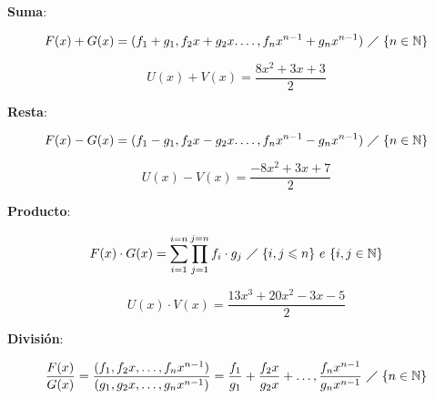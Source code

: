 \begin{enumerate}[I.]

{
\item \textbf{Suma}:

\begin{equation}
F(x) + G(x) = (f_1 + g_1, f_2 x + g_2 x. \ldots, f_n x^{n-1} + g_n x^{n-1})\ 
\diagup\ \{n \in \mathbb{N}\}
\end{equation}

\ejem

\begin{equation}
U(x) + V(x) = \frac{8 x^{2} + 3 x + 3}{2}
\end{equation}


}

{
\item \textbf{Resta}:

\begin{equation}
F(x) - G(x) = (f_1 - g_1, f_2 x - g_2 x. \ldots, f_n x^{n-1} - g_n x^{n-1})\ 
\diagup\ \{n \in \mathbb{N}\}
\end{equation}

\ejem

\begin{equation}
U(x) - V(x) = \frac{-8 x^{2} + 3 x + 7}{2}
\end{equation}


}

{
\item \textbf{Producto}:

\begin{equation}
F(x) \cdot G(x) = \sum\limits_{i=1}^{i=n} \prod\limits_{j=1}^{j=n} f_i 
\cdot 
g_j\ \diagup\ \{i,j \leqslant n\}\ e\ \{i,j \in \mathbb{N}\}
\end{equation}

\ejem

\begin{equation}
U(x) \cdot V(x) = \frac{13 x^3 + 20 x^2 -3 x -5}{2}
\end{equation}


}

{
\item \textbf{División}:

\begin{equation}
\frac{F(x)}{G(x)} = \frac{(f_1, f_2 x, \ldots, f_n x^{n-1})}{(g_1, g_2 x , 
\ldots, g_n x^{n-1})} = \frac{f_1}{g_1} + \frac{f_2 x}{g_2 x} + \ldots, 
\frac{f_n x^{n-1}}{g_n x^{n-1}}\ \diagup\ \{n \in \mathbb{N}\}
\end{equation}

}
\end{enumerate}
